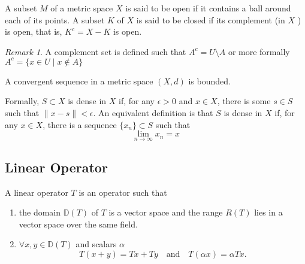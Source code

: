 \documentclass{article}
\theoremstyle{remark}
\newtheorem*{remark}{Remark}
\begin{document}
\begin{definition}
  A subset $M$ of a metric space $X$ is said to be open if it contains a ball around each of its points. A subset $K$ of $X$ is said to be closed if its complement (in $X$ ) is open, that is, $K^{c} = X - K$ is open.  
\end{definition}

\begin{remark}
  A complement set is defined such that $A^{c} = U \setminus A $ or more formally $A^{c} = \{x \in U  \mid x \not\in A \} $
\end{remark}

\begin{lemma}
  A convergent sequence in a metric space $\left( X,d \right) $ is bounded. 
\end{lemma}

\begin{definition}
  Formally, $S \subset X$ is dense in $X$ if, for any $\epsilon > 0$ and $x \in X$, there is some $s \in S$ such that $\|x-s\| < \epsilon$. An equivalent definition is that $S$ is dense in $X$ if, for any $x \in X$, there is a sequence $\{x_{n}\} \subset S$ such that \[
  \lim_{n \to \infty} x_{n} = x
  \] 
  
\end{definition}


\subsection{Linear Operator}%
\label{sub:linear_operator}

\begin{definition}
  A linear operator $T$ is an operator such that 
  \begin{enumerate}
    \item the domain $\mathbb{D}\left( T \right) $ of $T$ is a vector space and the range $R\left( T \right) $ lies in a vector space over the same field. 
    \item  $\forall x,y \in \mathbb{D}\left( T \right) $ and scalars $\alpha$ 
      \begin{equation}
      \label{eq:linear-operator}
      T\left( x + y \right) = Tx + Ty \quad \text{and} \quad T\left( \alpha x \right) = \alpha Tx
      .\end{equation}
  \end{enumerate}

\end{definition}
\end{document}
